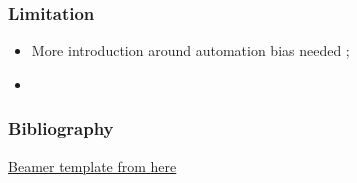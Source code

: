 \documentclass[compress,12pt]{beamer}
\begin{document}
\begin{frame}
      \frametitle{Limitation}
      \begin{itemize}
            \item More introduction around automation bias needed ;
            \item 
      \end{itemize}
\end{frame}



\End
\begin{frame}
      \frametitle{Bibliography}
      \scriptsize{
            
            
            \href{https://github.com/piazzai/arguelles}{Beamer template from here \faGithub} \\
      }
\end{frame}
\end{document}
